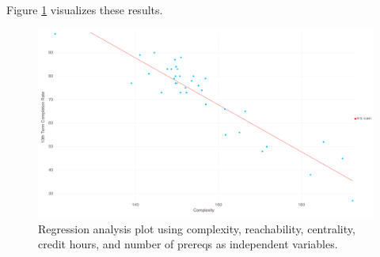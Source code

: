 \documentclass[botnum, fleqn]{unmeethesis}
\begin{document}
      Figure \ref{fig:bestfit} visualizes these results.

      \begin{figure}[h!]
        \centerline{\includegraphics[scale=0.25]{./figures/complexity_optimal.png}}
        \caption{Regression analysis plot using complexity, reachability, centrality, credit hours, and number of prereqs as independent variables.} 
        \label{fig:bestfit}
      \end{figure}


      



\end{document}
